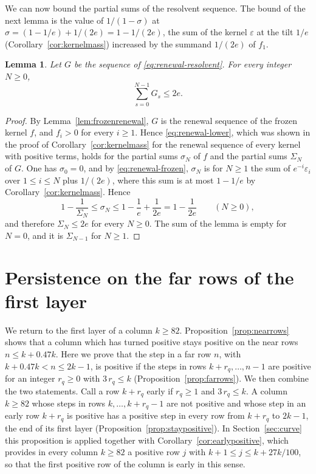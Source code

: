 \documentclass{amsart}
\newtheorem{lemma}[theorem]{Lemma}
\theoremstyle{definition}
\theoremstyle{remark}
\numberwithin{equation}{section}
\begin{document}
We can now bound the partial sums of the resolvent sequence. The bound of
the next lemma is the value of $1/(1-\sigma)$ at
$\sigma=(1-1/e)+1/(2e)=1-1/(2e)$, the sum of the kernel $\varepsilon$ at the
tilt $1/e$ (Corollary~\ref{cor:kernelmass}) increased by the summand
$1/(2e)$ of $f_1$.

\begin{lemma}\label{lem:resolventmass}
Let $G$ be the sequence of \eqref{eq:renewal-resolvent}. For every integer
$N\ge0$,
\[
\sum_{s=0}^{N-1}G_s\le2e .
\]
\end{lemma}

\begin{proof}
By Lemma~\ref{lem:frozenrenewal}, $G$ is the renewal sequence of the frozen
kernel $f$, and $f_i>0$ for every $i\ge1$. Hence \eqref{eq:renewal-lower},
which was shown in the proof of Corollary~\ref{cor:kernelmass} for the
renewal sequence of every kernel with positive terms, holds for the partial
sums $\sigma_N$ of $f$ and the partial sums $\Sigma_N$ of $G$. One has
$\sigma_0=0$, and by \eqref{eq:renewal-frozen}, $\sigma_N$ is for $N\ge1$ the
sum of $e^{-i}\varepsilon_i$ over $1\le i\le N$ plus $1/(2e)$,
where this sum is at most $1-1/e$ by Corollary~\ref{cor:kernelmass}. Hence
\[
1-\frac{1}{\Sigma_N}\le\sigma_N\le1-\frac1e+\frac{1}{2e}=1-\frac{1}{2e}
\qquad(N\ge0),
\]
and therefore $\Sigma_N\le2e$ for every $N\ge0$. The sum of the lemma is
empty for $N=0$, and it is $\Sigma_{N-1}$ for $N\ge1$.
\end{proof}

\section{Persistence on the far rows of the first layer}\label{sec:far}
We return to the first layer of a column $k\ge82$.
Proposition~\ref{prop:nearrows} shows that a column which has turned
positive stays positive on the near rows $n\le k+0.47k$. Here we prove that
the step in a far row $n$, with $k+0.47k<n\le2k-1$, is positive if the steps
in rows $k+r_q,\dots,n-1$ are positive for an integer $r_q\ge0$ with
$3\,r_q\le k$ (Proposition~\ref{prop:farrows}). We then combine the two
statements. Call a row $k+r_q$ early if $r_q\ge1$ and $3\,r_q\le k$. A
column $k\ge82$ whose steps in rows $k,\dots,k+r_q-1$ are not positive and
whose step in an early row $k+r_q$ is positive has a positive step in every
row from $k+r_q$ to $2k-1$, the end of its first layer
(Proposition~\ref{prop:staypositive}). In
Section~\ref{sec:curve} this proposition is applied together with
Corollary~\ref{cor:earlypositive}, which provides in every column $k\ge82$
a positive row $j$ with $k+1\le j\le k+27k/100$, so that the first positive
row of the column is early in this sense.
\end{document}
